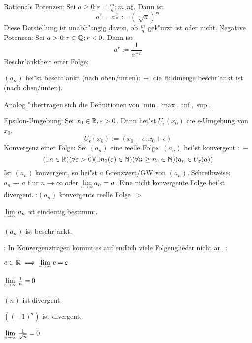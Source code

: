  Rationale Potenzen:{
  Sei $a\ge 0;r=\frac m n;m,n \natural$. Dann ist
  \[a^r=a^\frac m n:=\left(\sqrt[n]a\right)^m
    \]
  Diese Darstellung ist unabh"angig davon, ob $\frac m n $ gek"urzt ist
  oder nicht.
  }
 Negative Potenzen:{
  Sei $a>0;r\in\mathbb Q;r<0$. Dann ist
  \[a^r:=\frac 1{a^{-r}}
    \]
  }
 Beschr"anktheit einer Folge:{
  $(a_n)$ hei"st beschr"ankt (nach oben/unten)$:\equiv$ die Bildmenge
  beschr"ankt ist (nach oben/unten).
  
  Analog "ubertragen sich die Definitionen von $\min,\max,\inf,\sup$.
  }
 Epsilon-Umgebung:{
  Sei $x_0\in\mathbb R,\varepsilon>0$. Dann hei"st $U_\epsilon(x_0)$ die
  $\epsilon$-Umgebung von $x_0$.
  \[U_\epsilon(x_0):=(x_0-\epsilon;x_0+\epsilon)
    \]
}
 Konvergenz einer Folge:{
  Sei $(a_n)$ eine reelle Folge. $(a_n)$ hei"st konvergent $:\equiv$
  \[(\exists a\in\mathbb R)(\forall \varepsilon>0)(\exists n_0(\varepsilon)\in\mathbb N)
    (\forall n\ge n_0\in\mathbb N)(a_n\in U_\varepsilon(a))
    \]
  Ist $(a_n)$ konvergent, so hei"st $a$ Grenzwert/GW von $(a_n)$.
  Schreibweise: $a_n \to a$ f"ur $n\to\infty$ oder $\limn a_n=a$.
  Eine nicht konvergente Folge hei"st divergent.
}
\theorem:$(a_n)$ konvergente reelle Folge=>{
  \begin{stmts}
    \item $\limn a_n$ ist eindeutig bestimmt.
    \item $(a_n)$ ist beschr"ankt.
    \end{stmts}
  }
\remark:{
  In Konvergenzfragen kommt es auf endlich viele Folgenglieder nicht an.
  }
\example:{
  \begin{stmts}
    \item $c\real\implies\limn c=c$ 
    \item $\limn \frac 1 n=0$ 
    \item $(n)$ ist divergent.
    \item $((-1)^n)$ ist divergent.
    \item $\limn \frac 1 {\sqrt{n}}=0$
    \end{stmts}
  }
